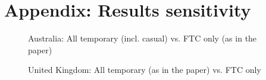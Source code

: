 \documentclass[12pt]{article}
\begin{document}
\clearpage
\appendix
\setcounter{table}{0}
\setcounter{figure}{0}
\renewcommand*\thetable{\Alph{section}.\arabic{table}}
\renewcommand*\thefigure{\Alph{section}.\arabic{figure}}
\renewcommand{\theHfigure}{\Alph{section}.\arabic{table}}
\renewcommand{\theHtable}{\Alph{section}.\arabic{figure}}

\section{Appendix: Results sensitivity}\label{sec:sensitivity}

\begin{figure}
    \caption{Australia: All temporary (incl. casual) vs. FTC only (as in the paper)}
    \label{graph_sensitivity_AU}
\end{figure}

\begin{figure}
    \caption{United Kingdom: All temporary (as in the paper) vs. FTC only}
    \label{graph_sensitivity_UK}
\end{figure}
\end{document}
